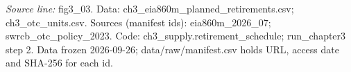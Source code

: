 {\scriptsize\textit{Source line:} fig3\_\allowbreak{}03. Data: ch3\_\allowbreak{}eia860m\_\allowbreak{}planned\_\allowbreak{}retirements.csv; ch3\_\allowbreak{}otc\_\allowbreak{}units.csv. Sources (manifest ids): eia860m\_\allowbreak{}2026\_\allowbreak{}07; swrcb\_\allowbreak{}otc\_\allowbreak{}policy\_\allowbreak{}2023. Code: ch3\_\allowbreak{}supply.retirement\_\allowbreak{}schedule; run\_\allowbreak{}chapter3 step 2. Data frozen 2026-09-26; data/raw/manifest.csv holds URL, access date and SHA-256 for each id.}